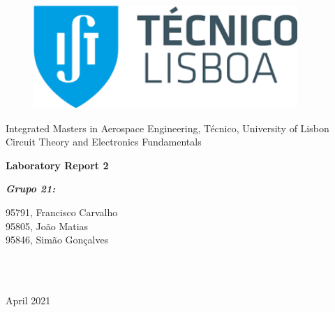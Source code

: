 \documentclass[11en, a4paper, oneside]{article}
\begin{document}
\begin{titlepage}
	\begin{center}
		\begin{figure}[htb!]
			\begin{center}
				\includegraphics[width=10cm]{../../figlib/tecnico.png}
			\end{center}
		\end{figure}
		
        \vspace{30pt}
        \begin{center}
        \Large{\center Integrated Masters in Aerospace Engineering, Técnico, University of Lisbon}\\
        \Large{\center Circuit Theory and Electronics Fundamentals}\\
        \end{center}
            
        \vspace{60pt}
        \Huge{\textbf{Laboratory Report 2}}
        
        \vspace{120pt}
        \begin{minipage}{0.4\textwidth}
		\begin{flushleft} \large
			\emph{\LARGE{\textbf{Grupo 21:}}}\par \vspace{10pt}
			95791, Francisco Carvalho \\ \vspace{20pt}
            95805, João Matias\\ \vspace{20pt}
            95846, Simão Gonçalves\\ \vspace{20pt}
		\end{flushleft}
	\end{minipage}
	~
	\begin{minipage}[b]{0.4\textwidth}
		\begin{flushright} \large
        	{}
		\end{flushright}
	\end{minipage}\\[2cm]
       \vspace{10pt}
        \large{April 2021}\\
	\end{center}
\end{titlepage}

\newpage
\renewcommand{\contentsname}{Índice}
\tableofcontents
\thispagestyle{empty}

\newpage
{}
\setcounter{page}{3}





\end{document}
